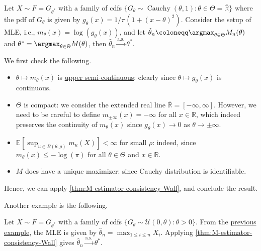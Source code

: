 \begin{eg}[Cauchy]
	Let \(X \sim F = G_{\theta ^{\ast} }\) with a family of cdfs \(\{ G_\theta \sim \operatorname{Cauchy}(\theta , 1) \colon \theta \in \Theta = \overline{\mathbb{R}} \} \) where the pdf of \(G_\theta \) is given by \(g_\theta (x) = 1 / \pi (1 + (x - \theta )^2)\). Consider the setup of MLE, i.e., \(m_\theta (x) = \log (g_\theta (x))\), and let \(\hat{\theta} _n \coloneqq \argmax_{\theta \in \Theta } M_n(\theta )\) and \(\theta ^{\ast} = \argmax_{\theta \in \Theta } M(\theta )\), then \(\hat{\theta} _n \overset{\text{a.s.} }{\to} \theta ^{\ast}\).
\end{eg}
\begin{explanation}
	We first check the following.
	\begin{itemize}
		\item \(\theta \mapsto m_\theta (x)\) is \hyperref[def:upper-semi-continuous]{upper semi-continuous}: clearly since \(\theta \mapsto g_\theta (x)\) is continuous.
		\item \(\Theta \) is compact: we consider the extended real line \(\overline{\mathbb{R}} = [-\infty , \infty ]\). However, we need to be careful to define \(m_{\pm \infty }(x) = -\infty \) for all \(x \in \mathbb{R} \), which indeed preserves the continuity of \(m_\theta (x)\) since \(g_\theta (x) \to 0\) as \(\theta \to \pm \infty \).
		\item \(\mathbb{E}_{}[\sup _{u \in B(\theta , \rho )} m_u(X)] < \infty \) for small \(\rho \): indeed, since \(m_\theta (x) \leq - \log (\pi )\) for all \(\theta \in \Theta \) and \(x \in \mathbb{R} \).
		\item \(M\) does have a unique maximizer: since Cauchy distribution is identifiable.
	\end{itemize}
	Hence, we can apply \autoref{thm:M-estimator-consistency-Wall}, and conclude the result.
\end{explanation}

Another example is the following.

\begin{eg}[Uniform]\label{eg:uniform-MLE}
	Let \(X \sim F = G_{\theta ^{\ast} }\) with a family of cdfs \(\{ G_\theta \sim \mathcal{U} (0, \theta ) \colon \theta > 0 \}\). From the \hyperref[eg:supremum-estimation-MLE]{previous example}, the MLE is given by \(\hat{\theta} _n = \max _{1 \leq i \leq n} X_i\). Applying \autoref{thm:M-estimator-consistency-Wall} gives \(\hat{\theta} _n \overset{\text{a.s.} }{\to} \theta ^{\ast} \).
\end{eg}

